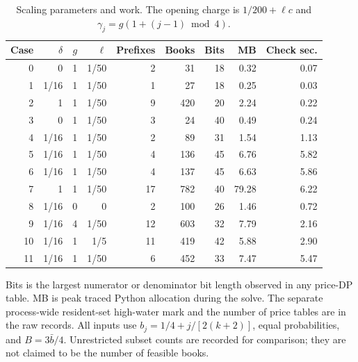\begin{table}[p]\centering\small
\caption{Scaling parameters and work. The opening charge is $1/200+\ell c$ and $\gamma_j=g(1+(j-1)\bmod4)$.}\label{tab:r43-scale-detail}
\begin{tabular}{rrrrrrrrr}\toprule
Case & $\delta$ & $g$ & $\ell$ & Prefixes & Books & Bits & MB & Check sec.\\\midrule
0 & 0 & 1 & 1/50 & 2 & 31 & 18 & 0.32 & 0.07 \\
1 & 1/16 & 1 & 1/50 & 1 & 27 & 18 & 0.25 & 0.03 \\
2 & 1 & 1 & 1/50 & 9 & 420 & 20 & 2.24 & 0.22 \\
3 & 0 & 1 & 1/50 & 3 & 24 & 40 & 0.49 & 0.24 \\
4 & 1/16 & 1 & 1/50 & 2 & 89 & 31 & 1.54 & 1.13 \\
5 & 1/16 & 1 & 1/50 & 4 & 136 & 45 & 6.76 & 5.82 \\
6 & 1/16 & 1 & 1/50 & 4 & 137 & 45 & 6.63 & 5.86 \\
7 & 1 & 1 & 1/50 & 17 & 782 & 40 & 79.28 & 6.22 \\
8 & 1/16 & 0 & 0 & 2 & 100 & 26 & 1.46 & 0.72 \\
9 & 1/16 & 4 & 1/50 & 12 & 603 & 32 & 7.79 & 2.16 \\
10 & 1/16 & 1 & 1/5 & 11 & 419 & 42 & 5.88 & 2.90 \\
11 & 1/16 & 1 & 1/50 & 6 & 452 & 33 & 7.47 & 5.47 \\
\bottomrule\end{tabular}
\par\smallskip\begin{minipage}{\textwidth}\small
Bits is the largest numerator or denominator bit length observed in any price-DP table. MB is peak traced Python allocation during the solve. The separate process-wide resident-set high-water mark and the number of price tables are in the raw records. All inputs use $b_j=1/4+j/[2(k+2)]$, equal probabilities, and $B=3\bar b/4$. Unrestricted subset counts are recorded for comparison; they are not claimed to be the number of feasible books.
\end{minipage}\end{table}
